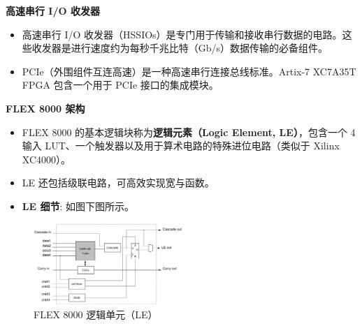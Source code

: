 \begin{frame}{\textbf{高速串行 I/O 收发器}}
\begin{itemize}
\item
    高速串行 I/O
    收发器（HSSIOs）是专门用于传输和接收串行数据的电路。这些收发器是进行速度约为每秒千兆比特（Gb/s）数据传输的必备组件。
\item
    PCIe（外围组件互连高速）是一种高速串行连接总线标准。Artix-7 XC7A35T
    FPGA 包含一个用于 PCIe 接口的集成模块。
\end{itemize}
\end{frame}

\begin{frame}{\textbf{FLEX 8000 架构}}
    \begin{itemize}
    \tightlist
    \item
    FLEX 8000 的基本逻辑块称为\textbf{逻辑元素（Logic
    Element, LE）}，包含一个 4 输入
    LUT、一个触发器以及用于算术电路的特殊进位电路（类似于 Xilinx
    XC4000）。
    \item
    LE 还包括级联电路，可高效实现宽与函数。
    \item
    \textbf{LE 细节}: 如图下图所示。
    \end{itemize}

\begin{figure}
    \centering
    \includegraphics[width=0.5\textwidth]{img1/FLEX800LE.jpeg}
    \caption{FLEX 8000 逻辑单元（LE）}
\end{figure}

\end{frame}

